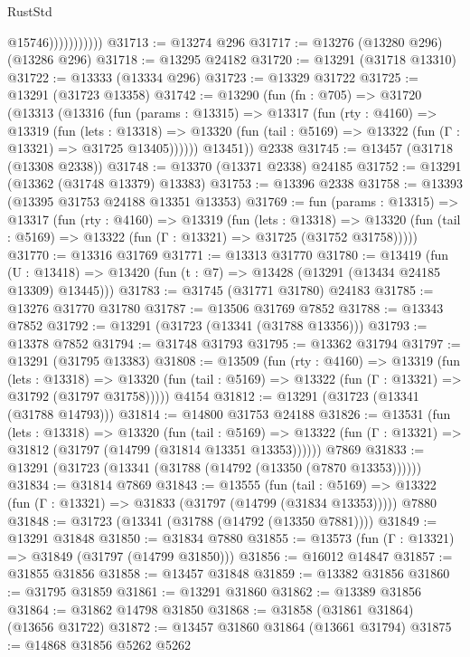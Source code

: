\begin{lexlean}{RustStd}
\begin{coremodule}
                          @15746)))))))))))
@31713 := @13274 @296
@31717 := @13276 (@13280 @296) (@13286 @296)
@31718 := @13295 @24182
@31720 := @13291 (@31718 @13310)
@31722 := @13333 (@13334 @296)
@31723 := @13329 @31722
@31725 := @13291 (@31723 @13358)
@31742 := @13290
    (fun (fn : @705) =>
    @31720
      (@13313
        (@13316
          (fun (params : @13315) =>
          @13317
            (fun (rty : @4160) =>
            @13319
              (fun (lets : @13318) =>
              @13320 (fun (tail : @5169) => @13322 (fun (Γ : @13321) => @31725 @13405))))))
        @13451))
    @2338
@31745 := @13457 (@31718 (@13308 @2338))
@31748 := @13370 (@13371 @2338) @24185
@31752 := @13291 (@13362 (@31748 @13379) @13383)
@31753 := @13396 @2338
@31758 := @13393 (@13395 @31753 @24188 @13351 @13353)
@31769 := fun (params : @13315) =>
  @13317
    (fun (rty : @4160) =>
    @13319
      (fun (lets : @13318) =>
      @13320 (fun (tail : @5169) => @13322 (fun (Γ : @13321) => @31725 (@31752 @31758)))))
@31770 := @13316 @31769
@31771 := @13313 @31770
@31780 := @13419
    (fun (U : @13418) => @13420 (fun (t : @7) => @13428 (@13291 (@13434 @24185 @13309) @13445)))
@31783 := @31745 (@31771 @31780) @24183
@31785 := @13276 @31770 @31780
@31787 := @13506 @31769 @7852
@31788 := @13343 @7852
@31792 := @13291 (@31723 (@13341 (@31788 @13356)))
@31793 := @13378 @7852
@31794 := @31748 @31793
@31795 := @13362 @31794
@31797 := @13291 (@31795 @13383)
@31808 := @13509
    (fun (rty : @4160) =>
    @13319
      (fun (lets : @13318) =>
      @13320 (fun (tail : @5169) => @13322 (fun (Γ : @13321) => @31792 (@31797 @31758)))))
    @4154
@31812 := @13291 (@31723 (@13341 (@31788 @14793)))
@31814 := @14800 @31753 @24188
@31826 := @13531
    (fun (lets : @13318) =>
    @13320
      (fun (tail : @5169) =>
      @13322 (fun (Γ : @13321) => @31812 (@31797 (@14799 (@31814 @13351 @13353))))))
    @7869
@31833 := @13291 (@31723 (@13341 (@31788 (@14792 (@13350 (@7870 @13353))))))
@31834 := @31814 @7869
@31843 := @13555
    (fun (tail : @5169) => @13322 (fun (Γ : @13321) => @31833 (@31797 (@14799 (@31834 @13353)))))
    @7880
@31848 := @31723 (@13341 (@31788 (@14792 (@13350 @7881))))
@31849 := @13291 @31848
@31850 := @31834 @7880
@31855 := @13573 (fun (Γ : @13321) => @31849 (@31797 (@14799 @31850)))
@31856 := @16012 @14847
@31857 := @31855 @31856
@31858 := @13457 @31848
@31859 := @13382 @31856
@31860 := @31795 @31859
@31861 := @13291 @31860
@31862 := @13389 @31856
@31864 := @31862 @14798 @31850
@31868 := @31858 (@31861 @31864) (@13656 @31722)
@31872 := @13457 @31860 @31864 (@13661 @31794)
@31875 := @14868 @31856 @5262 @5262

\end{coremodule}
\end{lexlean}
